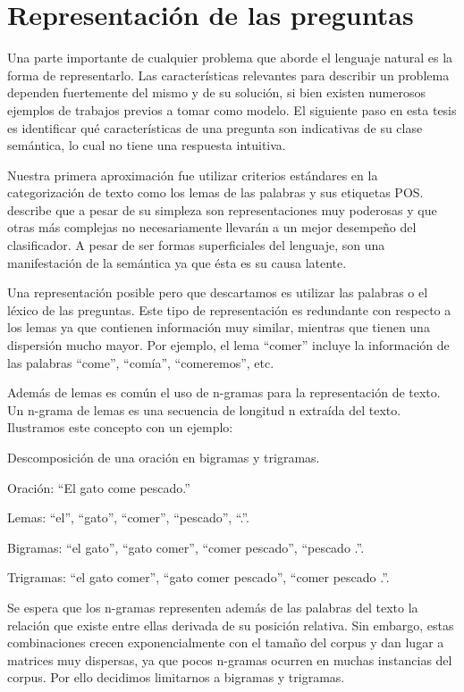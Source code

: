 \chapter{Representación de las preguntas}\label{capitulo-features}

Una parte importante de cualquier problema que aborde el lenguaje natural es la forma de representarlo. Las características relevantes para describir un problema dependen fuertemente del mismo y de su solución, si bien existen numerosos ejemplos de trabajos previos a tomar como modelo. El siguiente paso en esta tesis es identificar qué características de una pregunta son indicativas de su clase semántica, lo cual no tiene una respuesta intuitiva.

Nuestra primera aproximación fue utilizar criterios estándares en la categorización de texto como los lemas de las palabras y sus etiquetas POS. \citet{Sebastiani-text-categorization} describe que a pesar de su simpleza son representaciones muy poderosas y que otras más complejas no necesariamente llevarán a un mejor desempeño del clasificador. A pesar de ser formas superficiales del lenguaje, son una manifestación de la semántica ya que ésta es su causa latente.

Una representación posible pero que descartamos es utilizar las palabras o el léxico de las preguntas. Este tipo de representación es redundante con respecto a los lemas ya que contienen información muy similar, mientras que tienen una dispersión mucho mayor. Por ejemplo, el lema ``comer'' incluye la información de las palabras ``come'', ``comía'', ``comeremos'', etc.

Además de lemas es común el uso de n-gramas para la representación de texto. Un n-grama de lemas es una secuencia de longitud n extraída del texto. Ilustramos este concepto con un ejemplo:

\begin{example} Descomposición de una oración en bigramas y trigramas.

Oración: ``El gato come pescado.''

Lemas: ``el'', ``gato'', ``comer'', ``pescado'', ``.''.

Bigramas: ``el gato'', ``gato comer'', ``comer pescado'', ``pescado .''.

Trigramas: ``el gato comer'', ``gato comer pescado'', ``comer pescado .''.

\end{example}

Se espera que los n-gramas representen además de las palabras del texto la relación que existe entre ellas derivada de su posición relativa. Sin embargo, estas combinaciones crecen exponencialmente con el tamaño del corpus y dan lugar a matrices muy dispersas, ya que pocos n-gramas ocurren en muchas instancias del corpus. Por ello decidimos limitarnos a bigramas y trigramas.

